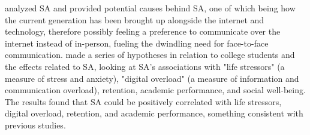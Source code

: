 \documentclass[12pt]{article}
\begin{document}
\textcite{RefWorks:RefID:78-bhalerao2020analysis} analyzed SA and provided potential causes 
behind SA, one of which being how the current generation has been brought up alongside the internet 
and technology, therefore possibly feeling a preference to communicate over the internet instead of 
in-person, fueling the dwindling need for face-to-face communication. \textcite{RefWorks:RefID:68-king2017impact} 
made a series of hypotheses in relation to college students and the effects 
related to SA, looking at SA's associations with "life stressors" (a measure of stress and anxiety), "digital overload" 
(a measure of information and communication overload), retention, academic performance, and social well-being. The results 
found that SA could be positively correlated with life stressors, digital overload, retention, and academic performance, 
something consistent with previous studies. %
\newline





 
\end{document}
